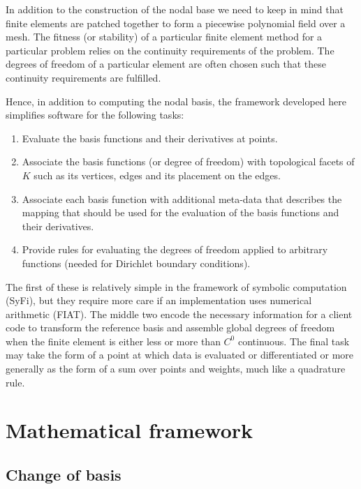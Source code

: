 In addition to the construction of the nodal base we need to keep
in mind that finite elements are patched together to form a piecewise
polynomial field over a mesh. The fitness (or stability) of a particular
finite element method for a particular problem relies on the continuity
requirements of the problem. The degrees of freedom of a particular
element are often chosen such that these continuity requirements are
fulfilled.

Hence, in addition to computing the nodal basis, the framework developed
here simplifies software for the following tasks:
%
\begin{enumerate}
\item Evaluate the basis functions and their derivatives at points.

\item Associate the basis functions (or degree of freedom) with
topological facets of $K$ such as its vertices, edges and its
placement on the edges.

\item Associate each basis function with additional meta-data that
describes the mapping that should be used for the evaluation of the
basis functions and their derivatives.

\item Provide rules for evaluating the degrees of freedom applied to
arbitrary functions (needed for Dirichlet boundary conditions).
\end{enumerate}
%
The first of these is relatively simple in the framework of symbolic
computation (SyFi), but they require more care if an implementation
uses numerical arithmetic (FIAT).  The middle two encode the necessary
information for a client code to transform the reference basis and
assemble global degrees of freedom when the finite element is either
less or more than $C^0$ continuous. The final task may take the form of
a point at which data is evaluated or differentiated or more generally
as the form of a sum over points and weights, much like a quadrature rule.

\section{Mathematical framework}
\subsection{Change of basis}



